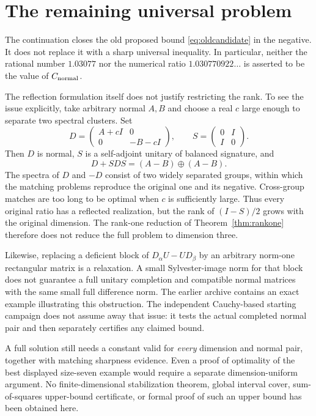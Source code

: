 \documentclass[11pt,letterpaper]{article}
\theoremstyle{remark}\newtheorem{remark}[theorem]{Remark}
\begin{document}
\section{The remaining universal problem}\label{sec:remaining}
The continuation closes the old proposed bound \eqref{eq:oldcandidate} in the negative. It does not replace it with a sharp universal inequality. In particular, neither the rational number $1.03077$ nor the numerical ratio $1.030770922\ldots$ is asserted to be the value of $C_{\mathrm{normal}}$.

The reflection formulation itself does not justify restricting the rank. To see the issue explicitly, take arbitrary normal $A,B$ and choose a real $c$ large enough to separate two spectral clusters. Set
\[
D=\begin{pmatrix}A+cI&0\\0&-B-cI\end{pmatrix},\qquad
S=\begin{pmatrix}0&I\\I&0\end{pmatrix}.
\]
Then $D$ is normal, $S$ is a self-adjoint unitary of balanced signature, and
\[
D+SDS=(A-B)\oplus(A-B).
\]
The spectra of $D$ and $-D$ consist of two widely separated groups, within which the matching problems reproduce the original one and its negative. Cross-group matches are too long to be optimal when $c$ is sufficiently large. Thus every original ratio has a reflected realization, but the rank of $(I-S)/2$ grows with the original dimension. The rank-one reduction of Theorem~\ref{thm:rankone} therefore does not reduce the full problem to dimension three.

Likewise, replacing a deficient block of $D_\alpha U-UD_\beta$ by an arbitrary norm-one rectangular matrix is a relaxation. A small Sylvester-image norm for that block does not guarantee a full unitary completion and compatible normal matrices with the same small full difference norm. The earlier archive contains an exact example illustrating this obstruction. The independent Cauchy-based starting campaign does not assume away that issue: it tests the actual completed normal pair and then separately certifies any claimed bound.

A full solution still needs a constant valid for \emph{every} dimension and normal pair, together with matching sharpness evidence. Even a proof of optimality of the best displayed size-seven example would require a separate dimension-uniform argument. No finite-dimensional stabilization theorem, global interval cover, sum-of-squares upper-bound certificate, or formal proof of such an upper bound has been obtained here.
\end{document}
